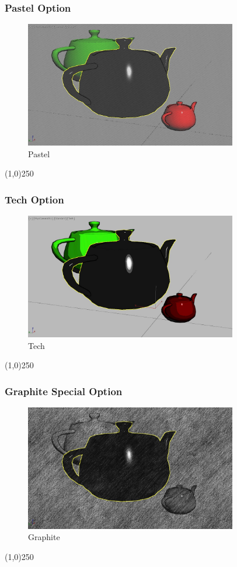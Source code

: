 \begin{frame}
\frametitle{Pastel Option}
\begin{figure}
	\centering
	\includegraphics[height=5.5cm]{img/ViewportOptions/Pastel.jpg}
	\caption{Pastel}
	\label{fig:Pastel}
\end{figure}
\end{frame}
\begin{center}\line(1,0){250}\end{center}


\begin{frame}
\frametitle{Tech Option}
\begin{figure}
	\centering
	\includegraphics[height=5.5cm]{img/ViewportOptions/Tech.jpg}
	\caption{Tech}
	\label{fig:Tech}
\end{figure}
\end{frame}
\begin{center}\line(1,0){250}\end{center}






\begin{frame}
\frametitle{Graphite Special Option}
\begin{figure}
	\centering
	\includegraphics[height=5.5cm]{img/ViewportOptions/Graphite.jpg}
	\caption{Graphite}
	\label{fig:GraphiteOption}
\end{figure}
\end{frame}
\begin{center}\line(1,0){250}\end{center}



